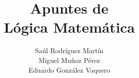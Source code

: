 \documentclass{report}
\theoremstyle{definition}
\theoremstyle{remark}
\numberwithin{section}{chapter}
\numberwithin{equation}{chapter}
\begin{document}
\frontmatter

\title{Apuntes de\\ Lógica Matemática}


\author{Saúl Rodríguez Martín\\ Miguel Muñoz Pérez \\ Eduardo González Vaquero}

\maketitle



\tableofcontents
{}



\mainmatter



\appendix

\backmatter

\printindex
\end{document}
